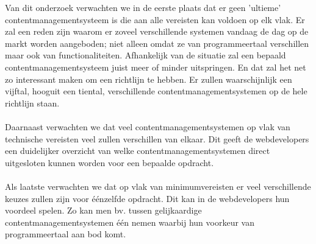 Van dit onderzoek verwachten we in de eerste plaats dat er geen 'ultieme' contentmanagementsysteem is die aan alle vereisten kan voldoen op elk vlak. Er zal een reden zijn waarom er zoveel verschillende systemen vandaag de dag op de markt worden aangeboden; niet alleen omdat ze van programmeertaal verschillen maar ook van functionaliteiten. Afhankelijk van de situatie zal een bepaald contentmanagementsysteem juist meer of minder uitspringen. En dat zal het net zo interessant maken om een richtlijn te hebben. Er zullen waarschijnlijk een vijftal, hooguit een tiental, verschillende contentmanagementsystemen op de hele richtlijn staan.
\\\\
Daarnaast verwachten we dat veel contentmanagementsystemen op vlak van technische vereisten veel zullen verschillen van elkaar. Dit geeft de webdevelopers een duidelijker overzicht van welke contentmanagementsystemen direct uitgesloten kunnen worden voor een bepaalde opdracht.
\\\\
Als laatste verwachten we dat op vlak van minimumvereisten er veel verschillende keuzes zullen zijn voor éénzelfde opdracht. Dit kan in de webdevelopers hun voordeel spelen. Zo kan men bv. tussen gelijkaardige contentmanagementsystemen één nemen waarbij hun voorkeur van programmeertaal aan bod komt.  

